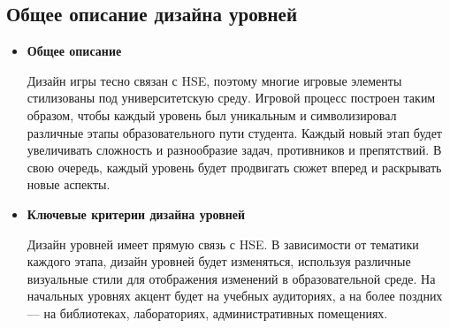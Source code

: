 
\subsection*{Общее описание дизайна уровней}
\begin{itemize}
\item \textbf{Общее описание} \par
Дизайн игры тесно связан с HSE, поэтому многие игровые элементы стилизованы под университетскую среду. 
Игровой процесс построен таким образом, чтобы каждый уровень был уникальным и символизировал различные этапы образовательного пути студента. 
Каждый новый этап будет увеличивать сложность и разнообразие задач, противников и препятствий. В свою очередь, каждый уровень будет продвигать сюжет вперед и раскрывать новые аспекты.

\item \textbf{Ключевые критерии дизайна уровней} \par
Дизайн уровней имеет прямую связь с HSE. В зависимости от тематики каждого этапа, дизайн уровней будет изменяться, используя различные визуальные стили для отображения изменений в образовательной среде.
На начальных уровнях акцент будет на учебных аудиториях, а на более поздних — на библиотеках, лабораториях, административных помещениях.
\end{itemize}
